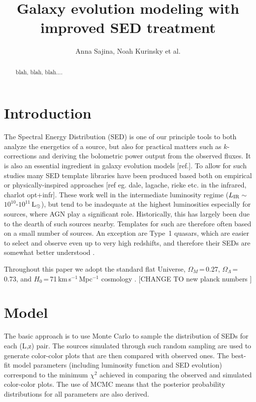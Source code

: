 \documentclass{emulateapj}
\newcommand{\lsun}{\,$\rm{L}_{\odot}$}
\begin{document}
\title{Galaxy evolution modeling with improved SED treatment}

\author{Anna Sajina, Noah Kurinsky et al.} %


\begin{abstract}

blah, blah, blah....

\end{abstract}


\section{Introduction}

The Spectral Energy Distribution (SED) is one of our principle tools to both analyze the energetics of a source, but also for practical matters such as $k$-corrections and deriving the bolometric power output from the observed fluxes.  It is also an essential ingredient in galaxy evolution models [ref.]. To allow for such studies many  SED template libraries have been produced based both on empirical or physically-inspired  approaches [ref eg. dale, lagache, rieke etc. in the infrared, charlot opt+infr].  These work well in the intermediate luminosity regime ($L_{\rm{IR}}$\,$\sim$\,$10^{10}$-$10^{11}$\lsun), but tend to be inadequate at the highest luminosities especially for sources, where AGN play a significant role. Historically, this has largely been due to the dearth of such sources nearby.  Templates for such are therefore often based on a small number of sources. An exception are Type~1 quasars, which are easier to select and observe even up to very high redshifts, and therefore their SEDs are  somewhat better understood \citep[e.g.][]{elvis94,richards06}. 

Throughout this paper we adopt the standard flat Universe, $\Omega_{M}$\,=\,0.27, $\Omega_{\Lambda}$\,=\,0.73, and $H_0$\,=\,71\,km\,s$^{-1}$\,Mpc$^{-1}$ cosmology \citep{spergel03}.
[CHANGE TO new planck numbers ]

\section{Model}

The basic approach is to use Monte Carlo to sample the distribution of SEDs for each (L,z) pair. The sources simulated through such random sampling are used to generate color-color plots that are then compared with observed ones. The best-fit model parameters (including luminosity function and SED evolution) correspond to the minimum $\chi^2$ achieved in comparing the observed and simulated color-color plots. The use of MCMC means that the posterior probability distributions for all parameters are also derived. 
\end{document}
